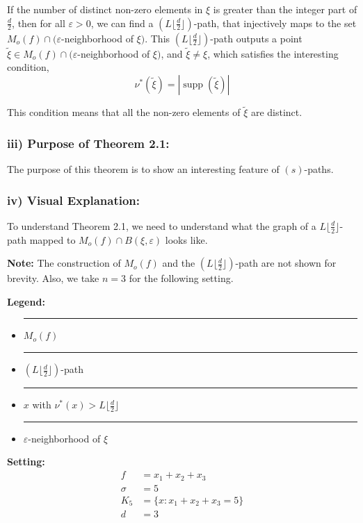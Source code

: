 \documentclass[12pt]{article}
\theoremstyle{definition}
\DeclareMathOperator{\supp}{supp}
\begin{document}
If the number of distinct non-zero elements in $\xi$ is greater than the integer part of $\frac{d}{2}$, then for all $\varepsilon > 0$, we can find a $(L\lfloor \frac{d}{2} \rfloor)$-path, that injectively maps to the set $M_o(f) \cap (\varepsilon$-neighborhood of $\xi)$. This $(L\lfloor \frac{d}{2} \rfloor)$-path outputs a point $\tilde{\xi} \in M_o(f) \cap (\varepsilon$-neighborhood of $\xi)$, and $\tilde{\xi} \neq \xi$, which satisfies the interesting condition,
\[
\nu^*(\tilde{\xi}) = |\supp(\tilde{\xi})|
\]

This condition means that all the non-zero elements of $\tilde{\xi}$ are distinct.

\subsubsection*{iii) Purpose of Theorem 2.1:}

The purpose of this theorem is to show an interesting feature of $(s)$-paths.

\subsubsection*{iv) Visual Explanation:}


To understand Theorem 2.1, we need to understand what the graph of a $L\lfloor \frac{d}{2} \rfloor$-path mapped to $M_o(f) \cap B(\xi, \varepsilon)$ looks like.

\textbf{Note:} The construction of $M_o(f)$ and the $(L\lfloor \frac{d}{2} \rfloor)$-path are not shown for brevity. Also, we take $n = 3$ for the following setting.

\textbf{Legend:}
\begin{itemize}
\item {\color{red}\rule{1cm}{2pt}} $M_o(f)$
\item {\color{green}\rule{1cm}{2pt}} $(L\lfloor \frac{d}{2} \rfloor)$-path
\item {\color{blue}\rule{1cm}{2pt}} $x$ with $\nu^*(x) > L\lfloor \frac{d}{2} \rfloor$
\item {\color{purple}\rule{1cm}{2pt}} $\varepsilon$-neighborhood of $\xi$
\end{itemize}

\textbf{Setting:}
\begin{align*}
f &= x_1 + x_2 + x_3\\
\sigma &= 5\\
K_5 &= \{x : x_1 + x_2 + x_3 = 5\}\\
d &= 3
\end{align*}
\end{document}
